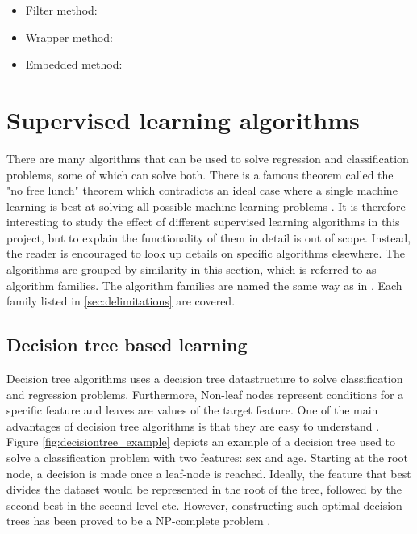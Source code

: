 
	\begin{itemize}
		\item{Filter method:}
		\item{Wrapper method:}
		\item{Embedded method:}
	\end{itemize}
	
\section{Supervised learning algorithms} \label{sec:supervised_algorithms}
	There are many algorithms that can be used to solve regression and classification problems, some of which can solve both. There is a famous theorem called the "no free lunch" theorem which contradicts an ideal case where a single machine learning is best at solving all possible machine learning problems \cite{ARTICLE:5}.  It is therefore interesting to study the effect of different supervised learning algorithms in this project, but to explain the functionality of them in detail is out of scope. Instead, the reader is encouraged to look up details on specific algorithms elsewhere. The algorithms are grouped by similarity in this section, which is referred to as algorithm families. The algorithm families are named the same way as in \cite{BOOK:6}. Each family listed in \ref{sec:delimitations} are covered. 

	\subsection{Decision tree based learning}
		Decision tree algorithms uses a decision tree datastructure to solve classification and regression problems. Furthermore, Non-leaf nodes represent conditions for a specific feature and leaves are values of the target feature. One of the main advantages of decision tree algorithms is that they are easy to understand \cite{ARTICLE:7}. Figure \ref{fig:decisiontree_example} depicts an example of a decision tree used to solve a classification problem with two features: sex and age. Starting at the root node, a decision is made once a leaf-node is reached. Ideally, the feature that best divides the dataset would be represented in the root of the tree, followed by the second best in the second level etc. However, constructing such optimal decision trees has been proved to be a NP-complete problem \cite{ARTICLE:11}. 

